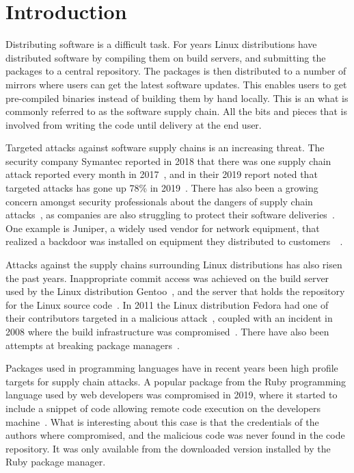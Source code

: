 \documentclass[../Main/thesis.tex]{subfiles}
\begin{document}
\chapter{Introduction}\label{ch:introduction}
Distributing software is a difficult task. For years Linux distributions have
distributed software by compiling them on build servers, and submitting the
packages to a central repository. The packages is then distributed to a number
of mirrors where users can get the latest software updates. This enables users
to get pre-compiled binaries instead of building them by hand locally. This is
an what is commonly referred to as the software supply chain. All the bits and
pieces that is involved from writing the code until delivery at the end user.

Targeted attacks against software supply chains is an increasing threat. The
security company Symantec reported in 2018 that there was one supply chain
attack reported every month in 2017~\cite{symantec-istr-2018}, and in their 2019
report noted that targeted attacks has gone up 78\% in
2019~\cite{symantec-istr-2019}. There has also been a growing concern amongst
security professionals about the dangers of supply chain
attacks~\cite{crowdstrike-supply-chain-attacks}, as companies are also
struggling to protect their software deliveries~\cite{cd-pipelines-case-study}.
One example is Juniper, a widely used vendor for network equipment, that
realized a backdoor was installed on equipment they distributed to
customers~\cite{Checkoway:2016:SAJ:2976749.2978395}~\cite{juniper-backdoor-advisory}.

Attacks against the supply chains surrounding Linux distributions has also risen
the past years. Inappropriate commit access was achieved on the build server
used by the Linux distribution Gentoo~\cite{gentoo-compromise-2018}, and the
server that holds the repository for the Linux source
code~\cite{linux-compromise-2011}.  In 2011 the Linux distribution Fedora had
one of their contributors targeted in a malicious
attack~\cite{fedora-compromise-2011}, coupled with an incident in 2008 where the
build infrastructure was compromised~\cite{fedora-compromise-2008}.  There have
also been attempts at breaking package
managers~\cite{Cappos:2008:LMA:1455770.1455841}.

Packages used in programming languages have in recent years been high profile
targets for supply chain attacks. A popular package from the Ruby programming
language used by web developers was compromised in 2019, where it started to
include a snippet of code allowing remote code execution on the developers
machine~\cite{malicious-ruby}. What is interesting about this case is that the
credentials of the authors where compromised, and the malicious code was never
found in the code repository. It was only available from the downloaded version
installed by the Ruby package manager.
\end{document}
